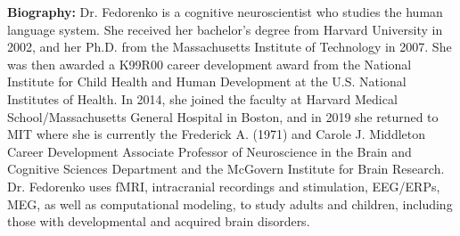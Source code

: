\vspace{3em}\par

\vfill
\noindent

{\bfseries Biography:}
Dr. Fedorenko is a cognitive neuroscientist who studies the human language system. She received her bachelor’s degree from Harvard University in 2002, and her Ph.D. from the Massachusetts Institute of Technology in 2007. She was then awarded a K99R00 career development award from the National Institute for Child Health and Human Development at the U.S. National Institutes of Health. In 2014, she joined the faculty at Harvard Medical School/Massachusetts General Hospital in Boston, and in 2019 she returned to MIT where she is currently the Frederick A. (1971) and Carole J. Middleton Career Development Associate Professor of Neuroscience in the Brain and Cognitive Sciences Department and the McGovern Institute for Brain Research. Dr. Fedorenko uses fMRI, intracranial recordings and stimulation, EEG/ERPs, MEG, as well as computational modeling, to study adults and children, including those with developmental and acquired brain disorders.

\newpage
